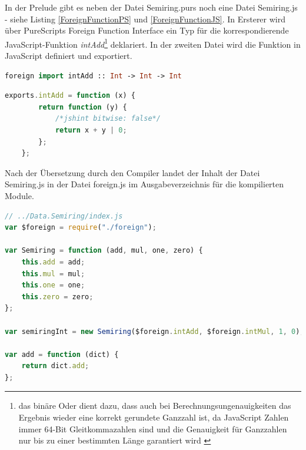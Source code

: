 \documentclass[
12pt,
ngerman,
oneside]
{scrbook} %
\begin{document}
In der Prelude gibt es neben der Datei Semiring.purs noch eine Datei Semiring.js - siehe Listing \ref{ForeignFunctionPS} und \ref{ForeignFunctionJS}. In Ersterer wird über PureScripts Foreign Function Interface ein Typ für die korrespondierende JavaScript-Funktion \emph{intAdd}\footnote{das binäre Oder dient dazu, dass auch bei Berechnungsungenauigkeiten das Ergebnis wieder eine korrekt gerundete Ganzzahl ist, da JavaScript Zahlen immer 64-Bit Gleitkommazahlen sind und die Genauigkeit für Ganzzahlen nur bis zu einer bestimmten Länge garantiert wird \cite{w3schoolsJSNumbers18}} deklariert. In der zweiten Datei wird die Funktion in JavaScript definiert und exportiert.

\noindent\begin{minipage}[t]{.49\textwidth} 
	\hspace*{0pt}\begin{lstlisting}[language=purescript, style=only-rect, caption= Foreign Function PS, label=ForeignFunctionPS]
	foreign import intAdd :: Int -> Int -> Int
	\end{lstlisting}
\end{minipage}%
% 
\hfill%
\begin{minipage}[t]{.49\textwidth} 
	\hspace*{0pt}\begin{lstlisting}[language=javascript, style=only-rect, caption= Foreign Function JS, label=ForeignFunctionJS] 
	exports.intAdd = function (x) {
		return function (y) {
			/*jshint bitwise: false*/
			return x + y | 0;
		};
	};
	\end{lstlisting}
\end{minipage}
\hfill%

Nach der Übersetzung durch den Compiler landet der Inhalt der Datei Semiring.js in der Datei foreign.js im Ausgabeverzeichnis für die kompilierten Module. 

\begin{lstlisting}[language=javascript, style=numbered-and-boxed, caption= Auszug aus übersetzen Modul Data.Semiring, label=Data.SemiringJS]
// ../Data.Semiring/index.js
var $foreign = require("./foreign");

var Semiring = function (add, mul, one, zero) {
	this.add = add;
	this.mul = mul;
	this.one = one;
	this.zero = zero;
};

var semiringInt = new Semiring($foreign.intAdd, $foreign.intMul, 1, 0);

var add = function (dict) {
	return dict.add;
};
\end{lstlisting}
\end{document}
